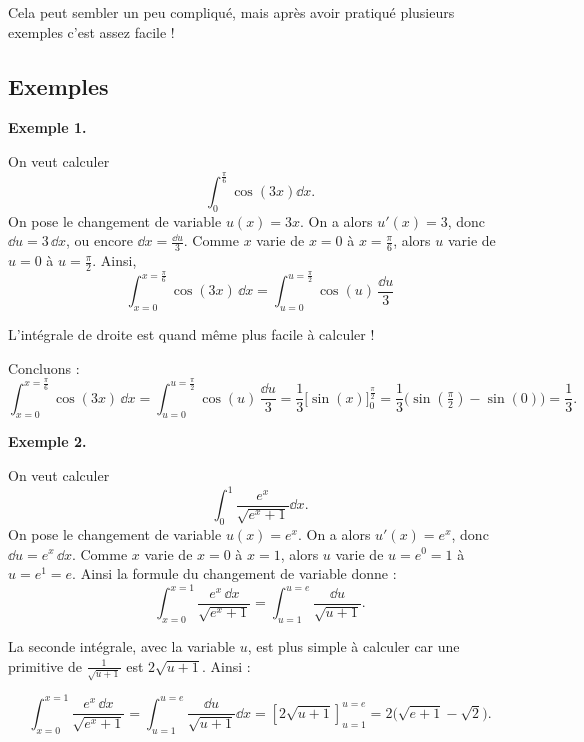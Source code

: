 \documentclass[11pt,class=report,crop=false]{standalone}
\begin{document}
Cela peut sembler un peu compliqué, mais après avoir pratiqué plusieurs exemples c'est assez facile !


\subsection*{Exemples} 


\textbf{Exemple 1.}

On veut calculer \[\int_{0}^{\frac{\pi}{6}}\cos(3x)\dd x.\]
On pose le changement de variable $u(x)=3x$. On a alors $u'(x)=3$, donc $\dd u = 3 \,\dd x$, ou encore
$\dd x = \frac{\dd u}{3}$.
Comme $x$ varie de $x=0$ à $x=\frac\pi6$, alors $u$ varie de $u=0$ à $u=\frac\pi2$.
Ainsi,  
$$
\int_{x=0}^{x=\frac{\pi}{6}}\cos(3x)\,\dd x 
= \int_{u=0}^{u=\frac{\pi}{2}} \cos(u) \, \frac{\dd u}{3}
$$

L'intégrale de droite est quand même plus facile à calculer !

Concluons :
$$
\int_{x=0}^{x=\frac{\pi}{6}}\cos(3x)\,\dd x 
= \int_{u=0}^{u=\frac{\pi}{2}} \cos(u) \, \frac{\dd u}{3}
= \frac13 \big[\sin(x)\big]_{0}^{\frac{\pi}{2}}
=\frac{1}{3}\big(\sin(\tfrac{\pi}{2})-\sin(0)\big)
=\frac{1}{3}.$$

\bigskip

\textbf{Exemple 2.}

On veut calculer \[\int_{0}^{1}\frac{e^x}{\sqrt{e^x+1}}\dd x.\]
On pose le changement de variable $u(x)=e^x$. On a alors $u'(x)=e^x$, donc $\dd u = e^x \,\dd x$.
Comme $x$ varie de $x=0$ à $x=1$, alors $u$ varie de $u=e^0=1$ à $u=e^1=e$.
Ainsi la formule du changement de variable donne : 
\[\int_{x=0}^{x=1}\frac{e^x \,\dd x}{\sqrt{e^x+1}}=\int_{u=1}^{u=e} \frac{\dd u}{\sqrt{u+1}}.\]

La seconde intégrale, avec la variable $u$, est plus simple à calculer car une primitive de $\frac{1}{\sqrt{u+1}}$ est $2\sqrt{u+1}$. Ainsi :

\[
\int_{x=0}^{x=1}\frac{e^x \,\dd x}{\sqrt{e^x+1}}
= \int_{u=1}^{u=e} \frac{\dd u}{\sqrt{u+1}}\dd x
= \left[ 2\sqrt{u+1} \right]_{u=1}^{u=e} 
= 2\big( \sqrt{e+1}-\sqrt{2} \big).
\]
\end{document}
